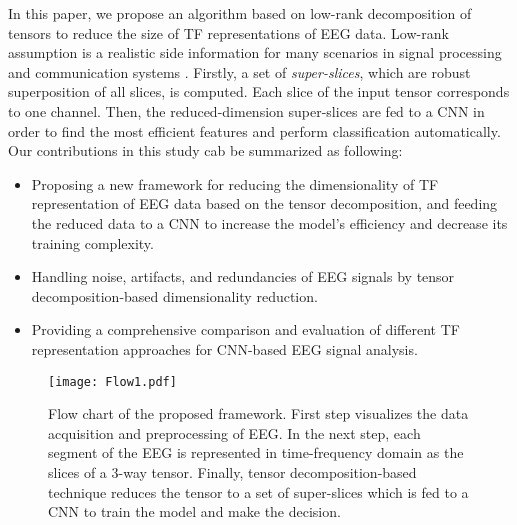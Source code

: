 \documentclass{article}
\begin{document}
\indent In this paper, we propose an algorithm based on low-rank decomposition of tensors to reduce the size of TF representations of EEG data. Low-rank assumption is a realistic side information for many scenarios in signal processing and communication systems \cite{joneidi16,tari19,ashk16}. 
Firstly, a set of \emph{super-slices}, which are robust superposition of all slices, is computed. Each slice of the input tensor corresponds to one channel. 
Then, the reduced-dimension super-slices are fed to a CNN in order to find the most efficient features and perform classification automatically. Our contributions in this study cab be summarized as following:\vspace{-3mm} 
\begin{itemize}
    \item Proposing a new framework for reducing the dimensionality of TF representation of EEG data based on the tensor decomposition, and feeding the reduced data to a CNN to increase the model's efficiency and decrease its training complexity.\vspace{-3mm} 
    \item Handling noise, artifacts, and redundancies of EEG signals by tensor decomposition-based dimensionality reduction.\vspace{-3mm}
    \item Providing a comprehensive comparison and evaluation of different TF representation approaches for CNN-based EEG signal analysis.\vspace{-2mm}
\end{itemize}
 
\begin{figure*}[htbp]
\centerline{\texttt{[image: Flow1.pdf]}}
\vspace{-3mm}
\caption{\small{Flow chart of the proposed framework. First step visualizes the data acquisition and preprocessing of EEG. In the next step, each segment of the EEG is represented in time-frequency domain as the slices of a 3-way tensor. Finally, tensor decomposition-based technique reduces the tensor to a set of super-slices which is fed to a CNN to train the model and make the decision.}   
}
\vspace{-3mm}
\label{Flow}
\end{figure*}
\end{document}

